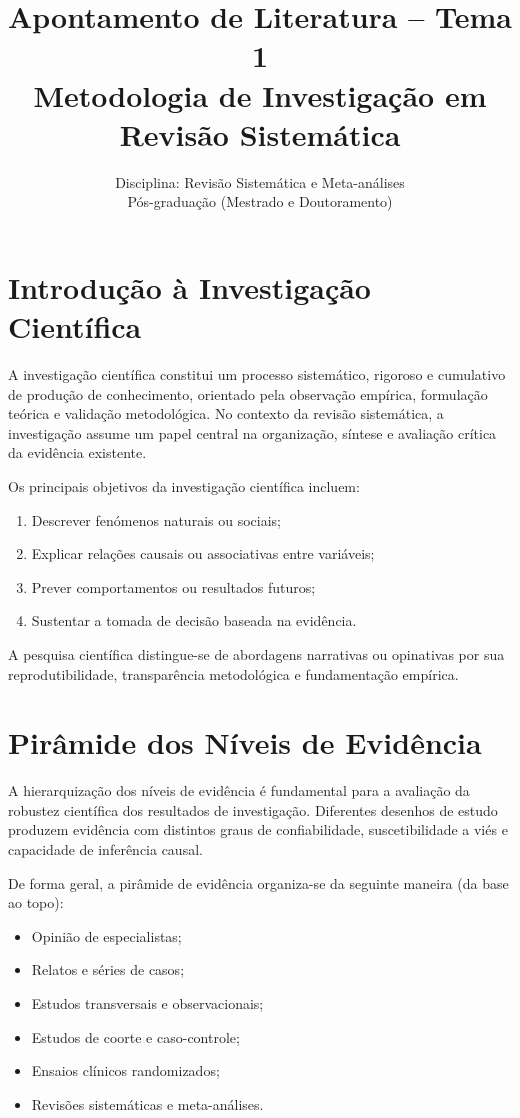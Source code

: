 \documentclass[12pt,a4paper]{article}
\title{
Apontamento de Literatura – Tema 1\\
\large Metodologia de Investigação em Revisão Sistemática
}
\author{
Disciplina: Revisão Sistemática e Meta-análises\\
Pós-graduação (Mestrado e Doutoramento)
}
\date{}
\begin{document}
\maketitle

\section{Introdução à Investigação Científica}

A investigação científica constitui um processo sistemático, rigoroso e cumulativo de produção de conhecimento, orientado pela observação empírica, formulação teórica e validação metodológica. No contexto da revisão sistemática, a investigação assume um papel central na organização, síntese e avaliação crítica da evidência existente.

Os principais objetivos da investigação científica incluem:
\begin{enumerate}
    \item Descrever fenómenos naturais ou sociais;
    \item Explicar relações causais ou associativas entre variáveis;
    \item Prever comportamentos ou resultados futuros;
    \item Sustentar a tomada de decisão baseada na evidência.
\end{enumerate}

A pesquisa científica distingue-se de abordagens narrativas ou opinativas por sua reprodutibilidade, transparência metodológica e fundamentação empírica.

\section{Pirâmide dos Níveis de Evidência}

A hierarquização dos níveis de evidência é fundamental para a avaliação da robustez científica dos resultados de investigação. Diferentes desenhos de estudo produzem evidência com distintos graus de confiabilidade, suscetibilidade a viés e capacidade de inferência causal.

De forma geral, a pirâmide de evidência organiza-se da seguinte maneira (da base ao topo):
\begin{itemize}
    \item Opinião de especialistas;
    \item Relatos e séries de casos;
    \item Estudos transversais e observacionais;
    \item Estudos de coorte e caso-controle;
    \item Ensaios clínicos randomizados;
    \item Revisões sistemáticas e meta-análises.
\end{itemize}
\end{document}
